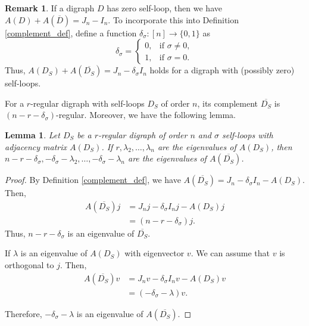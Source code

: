 \documentclass[12pt,a4paper,reqno]{amsart}
\numberwithin{equation}{section}
\theoremstyle{plain}
\newtheorem{lemma}[theorem]{Lemma}
\theoremstyle{definition}
\newtheorem{remark}[theorem]{Remark}
\newcommand{\<}{\langle}
\renewcommand{\>}{\rangle}
\begin{document}
    \begin{remark}
        If a digraph $D$ has zero self-loop, then we have $A(D)+A(\overline{D})=J_n-I_n$. To incorporate this into Definition \ref{complement_def}, define a function $\delta_\sigma: [n] \rightarrow \{0,1\}$ as
        \[\delta_\sigma=
        \begin{cases}
	0, &\text{if } \sigma \neq0,\\
	1, &\text{if } \sigma = 0.
        \end{cases}
        \]
        Thus, $A(D_S)+A(\overline{D_S})=J_n-\delta_{\sigma}I_n$ holds for a digraph with (possibly zero) self-loops.
    \end{remark}

    For a $r$-regular digraph with self-loops $D_S$ of order $n$, its complement $\overline{D_S}$ is $(n-r-\delta_\sigma)$-regular. Moreover, we have the following lemma.

    \begin{lemma}
        \label{lambda_complement_regular}
        Let $D_S$ be a $r$-regular digraph of order $n$ and $\sigma$ self-loops with adjacency matrix $A(D_S)$. If $r, \lambda_2, \ldots, \lambda_n$ are the eigenvalues of $A(D_S)$, then $n-r-\delta_\sigma,-\delta_\sigma-\lambda_2, \ldots, -\delta_\sigma-\lambda_n$ are the eigenvalues of $A(\overline{D_S})$. 
    \end{lemma}

    \begin{proof}
        By Definition \ref{complement_def}, we have $A(\overline{D_S})=J_n-\delta_\sigma I_n-A(D_S)$. Then, 
        \begin{align*}
            A(\overline{D_S})j &= J_nj-\delta_\sigma I_nj-A(D_S)j \\
              &= (n-r-\delta_\sigma )j.
        \end{align*}
        Thus, $n-r-\delta_\sigma $ is an eigenvalue of $\overline{D_S}$. 
        
        
        If $\lambda$ is an eigenvalue of $A(D_S)$ with eigenvector $v$. We can assume that $v$ is orthogonal to $j$. Then, 
        \begin{align*}
            A(\overline{D_S})v &= J_n v-\delta_\sigma I_nv-A(D_S)v \\
            &=(-\delta_\sigma-\lambda) v. 
        \end{align*}
        
        Therefore, $-\delta_\sigma-\lambda$ is an eigenvalue of $A(\overline{D_S})$.
    \end{proof}
\end{document}
